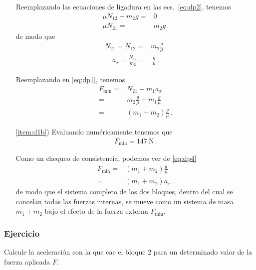 \begin{frame}
\begin{itemize}
    Reemplazando las ecuaciones de ligadura en las ecs.~\eqref{eq:dp2}, tenemos
    \begin{align*}
      \mu N_{12}-m_2g=&0\nonumber\\
      \mu N_{21}=&m_2g\,.
    \end{align*}
    de modo que 
    \begin{align*}
    N_{21}=N_{12}=&m_2\frac{g}{\mu}\,.
    \end{align*}
    \begin{align*}
    a_x=\frac{N_{12}}{m_2}=&\frac{g}{\mu}\,.
    \end{align*}

    Reemplazando en \eqref{eq:dp1}, tenemos
    \begin{align}
      \label{eq:dp4}
      F_{\text{min}}=&N_{21}+m_1 a_x\nonumber\\
      =&m_2\frac{g}{\mu}+m_1 \frac{g}{\mu}\nonumber\\
      =&(m_1+m_2)\frac{g}{\mu}\,.
    \end{align}

    \item[\ref{item:d1b})] Evaluando numéricamente tenemos que
      \begin{align*}
        F_{\text{min}}=\SI{147}{\newton}\,.
      \end{align*}

      Como un chequeo de consistencia, podemos ver de \eqref{eq:dp4}
      \begin{align*}
        F_{\text{min}}=&(m_1+m_2)\frac{g}{\mu}\nonumber\\
        =&(m_1+m_2)a_x\,.
      \end{align*}
      de modo que el sistema completo de los dos bloques, dentro del
      cual se cancelan todas las fuerzas internas, se mueve como un
      sistema de masa $m_1+m_2$ bajo el efecto de la fuerza externa
      $F_{\text{min}}$.\finejemplo

\end{itemize}
\end{frame}
\subsubsection*{Ejercicio}
Calcule la aceleración con la que cae el bloque 2 para un determinado valor de la fuerza aplicada $F$.

